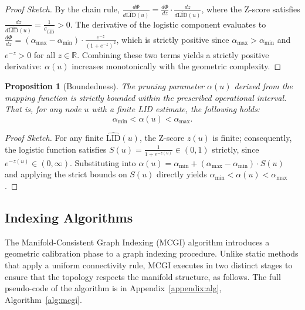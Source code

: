\documentclass{article}
\theoremstyle{plain}
\newtheorem{proposition}[theorem]{Proposition}
\theoremstyle{definition}
\theoremstyle{remark}
\newcommand{\don}[1]{\textcolor{blue}{[Dongfang: #1]}}
\begin{document}
\begin{proof}[Proof Sketch]
By the chain rule, $\frac{d\Phi}{d\widehat{\text{LID}}(u)} = \frac{d\Phi}{dz} \cdot \frac{dz}{d\widehat{\text{LID}}(u)}$, where the Z-score satisfies $\frac{dz}{d\widehat{\text{LID}}(u)} = \frac{1}{\sigma_{\widehat{\text{LID}}}} > 0$.
The derivative of the logistic component evaluates to $\frac{d\Phi}{dz} = (\alpha_{\max} - \alpha_{\min}) \cdot \frac{e^{-z}}{(1+e^{-z})^2}$, which is strictly positive since $\alpha_{\max} > \alpha_{\min}$ and $e^{-z} > 0$ for all $z \in \mathbb{R}$.
Combining these two terms yields a strictly positive derivative: $\alpha(u)$ increases monotonically with the geometric complexity.
\end{proof}

\begin{proposition}[Boundedness]
The pruning parameter $\alpha(u)$ derived from the mapping function is strictly bounded within the prescribed operational interval. That is, for any node $u$ with a finite LID estimate, the following holds:
\begin{equation}
    \alpha_{\min} < \alpha(u) < \alpha_{\max}.
\end{equation}
\end{proposition}

\begin{proof}[Proof Sketch]
For any finite $\widehat{\text{LID}}(u)$, the Z-score $z(u)$ is finite; consequently, the logistic function satisfies $S(u) = \frac{1}{1+e^{-z(u)}} \in (0, 1)$ strictly, since $e^{-z(u)} \in (0, \infty)$.
Substituting into $\alpha(u) = \alpha_{\min} + (\alpha_{\max} - \alpha_{\min}) \cdot S(u)$ and applying the strict bounds on $S(u)$ directly yields $\alpha_{\min} < \alpha(u) < \alpha_{\max}$.
\end{proof}

\subsection{Indexing Algorithms}
\label{subsec:algorithm}


The Manifold-Consistent Graph Indexing (MCGI) algorithm introduces a geometric calibration phase to a graph indexing procedure. Unlike static methods that apply a uniform connectivity rule, MCGI executes in two distinct stages to ensure that the topology respects the manifold structure, as follows. The full pseudo-code of the algorithm is in Appendix~\ref{appendix:alg}, Algorithm~\ref{alg:mcgi}.
\end{document}
